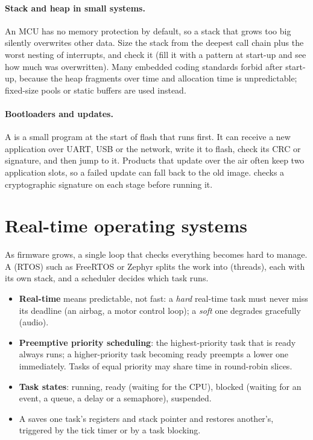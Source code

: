 \paragraph{Stack and heap in small systems.} An MCU has no memory protection by default, so a stack that grows too big silently overwrites other data. Size the stack from the deepest call chain plus the worst nesting of interrupts, and check it (fill it with a pattern at start-up and see how much was overwritten). Many embedded coding standards forbid  after start-up, because the heap fragments over time and allocation time is unpredictable; fixed-size pools or static buffers are used instead.

\paragraph{Bootloaders and updates.} A  is a small program at the start of flash that runs first. It can receive a new application over UART, USB or the network, write it to flash, check its CRC or signature, and then jump to it. Products that update over the air often keep two application slots, so a failed update can fall back to the old image.  checks a cryptographic signature on each stage before running it.

\section{Real-time operating systems}

As firmware grows, a single loop that checks everything becomes hard to manage. A  (RTOS) such as FreeRTOS or Zephyr splits the work into  (threads), each with its own stack, and a scheduler decides which task runs.

\begin{itemize}
  \item \textbf{Real-time} means predictable, not fast: a \emph{hard} real-time task must never miss its deadline (an airbag, a motor control loop); a \emph{soft} one degrades gracefully (audio).
  \item \textbf{Preemptive priority scheduling}: the highest-priority task that is ready always runs; a higher-priority task becoming ready preempts a lower one immediately. Tasks of equal priority may share time in round-robin slices.
  \item \textbf{Task states}: running, ready (waiting for the CPU), blocked (waiting for an event, a queue, a delay or a semaphore), suspended.
  \item A  saves one task's registers and stack pointer and restores another's, triggered by the tick timer or by a task blocking.
\end{itemize}

